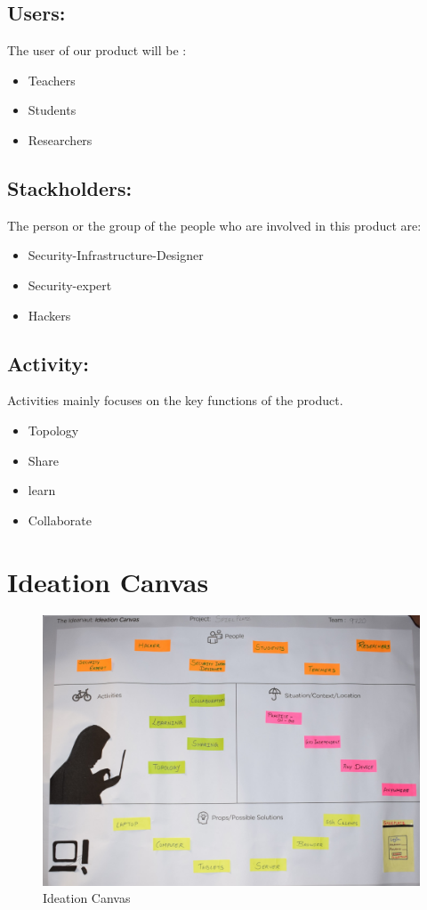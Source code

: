 \documentclass[12pt,a4paper,final,oneside]{report}
\begin{document}
	\subsection{Users:}
	The user of our product will be : \\
	 \begin{itemize}
	\item Teachers
   \item Students 
   \item Researchers 
\end{itemize}
	\subsection{Stackholders:}
	\noindent\par The person or  the group of the people who are involved in this product are:\\
	\noindent 
	\noindent\textbf{}
	\begin{itemize}
	\item Security-Infrastructure-Designer
   \item Security-expert
   \item Hackers 
   	\end{itemize}
   	\subsection{Activity:}
	\noindent\par Activities mainly focuses on the key functions of the product.\\
	\noindent 
	\noindent\textbf{}
	\begin{itemize}
	\item Topology
   \item Share
   \item learn
   \item Collaborate
   	\end{itemize}
\newpage
\raggedright
	\section{Ideation Canvas}
	\begin{figure}[h!]
		\centering
		\includegraphics[width=1.0\linewidth,angle=0]
		{IDEATION.jpg}
		\caption{Ideation Canvas}
		
	\end{figure}
	
\end{document}
